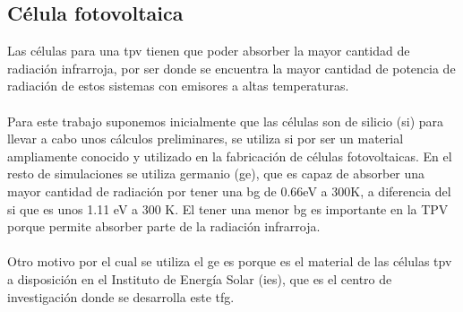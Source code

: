 \subsection{Célula fotovoltaica}
Las células para una \acrshort{tpv} tienen que poder absorber la mayor cantidad de radiación infrarroja, por ser donde se encuentra la mayor cantidad de potencia de radiación de estos sistemas con emisores a altas temperaturas.\\\\
Para este trabajo suponemos inicialmente que las células son de silicio (\gls{si}) para llevar a cabo unos cálculos preliminares, se utiliza \gls{si} por ser un material ampliamente conocido y utilizado en la fabricación de células fotovoltaicas. En el resto de simulaciones se utiliza germanio (\gls{ge}), que es capaz de absorber una mayor cantidad de radiación por tener una \acrshort{bg} de 0.66eV a 300K, a diferencia del \gls{si} que es unos 1.11 eV a 300 K. El tener una menor \acrshort{bg} es importante en la TPV porque permite absorber parte de la radiación infrarroja.\\\\
Otro motivo por el cual se utiliza el \gls{ge} es porque es el material de las células \acrshort{tpv} a disposición en el Instituto de Energía Solar (\acrshort{ies}), que es el centro de investigación donde se desarrolla este \acrshort{tfg}.
